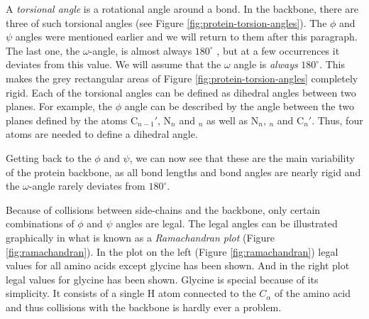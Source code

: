 A \textit{torsional angle} is a rotational angle around a bond. In the
backbone, there are three of such torsional angles (see Figure
\ref{fig:protein-torsion-angles}). The $\phi$ and $\psi$ angles were
mentioned earlier and we will return to them after this paragraph. The
last one, the $\omega$-angle, is almost always $180^{\circ}$
\cite{probik}, but at a few occurrences it deviates from this
value. We will assume that the $\omega$ angle is \textit{always}
$180^{\circ}$. This makes the grey rectangular areas of Figure
\ref{fig:protein-torsion-angles} completely rigid.  Each of the
torsional angles can be defined as dihedral angles between two
planes. For example, the $\phi$ angle can be described by the angle
between the two planes defined by the atoms C$_{n-1}'$, N$_n$ and \Ca
$_n$ as well as N$_n$, \Ca $_n$ and C$_n'$. Thus, four atoms are
needed to define a dihedral angle.

Getting back to the $\phi$ and $\psi$, we can now see that these are
the main variability of the protein backbone, as all bond lengths and
bond angles are nearly rigid and the $\omega$-angle rarely
deviates from $180^\circ$. 

Because of collisions between side-chains and the backbone, only
certain combinations of $\phi$ and $\psi$ angles are legal. The legal
angles can be illustrated graphically in what is known as a
\textit{Ramachandran plot} (Figure \ref{fig:ramachandran}). In the
plot on the left (Figure \ref{fig:ramachandran}) legal values for all
amino acids except glycine has been shown. And in the right plot legal
values for glycine has been shown. Glycine is special because of its
simplicity. It consists of a single H atom connected to the $C_\alpha$
of the amino acid and thus collisions with the backbone is hardly ever
a problem.

